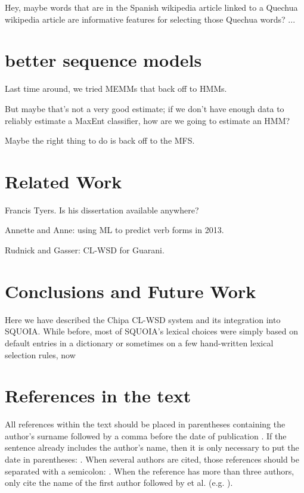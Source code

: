 \documentclass[10pt, a4paper]{article}
\begin{document}
Hey, maybe words that are in the Spanish wikipedia article linked to a Quechua wikipedia article are informative features for selecting those Quechua words? ...


\section{better sequence models}


Last time around, we tried MEMMs that back off to HMMs.


But maybe that's not a very good estimate; if we don't have enough data to reliably estimate a MaxEnt classifier, how are we going to estimate an HMM?


Maybe the right thing to do is back off to the MFS.




\section{Related Work}
Francis Tyers. Is his dissertation available anywhere?


Annette and Anne: using ML to predict verb forms in 2013.


Rudnick and Gasser: CL-WSD for Guarani.


\section{Conclusions and Future Work}
Here we have described the Chipa CL-WSD system and its integration into SQUOIA. While before, most of SQUOIA's lexical choices were simply based on default entries in a dictionary or sometimes on a few hand-written lexical selection rules, now 


\section{References in the text}

All references within the text should be placed in parentheses containing the author's surname followed by a comma before the date of publication \cite{Martin-90}. If the sentence already includes the author's name, then it is only necessary to put the date in parentheses: . When several authors are cited, those references should be separated with a semicolon: \cite{Martin-90,CastorPollux-92}. When the reference has more than three authors, only cite the name of the first author followed by et al. (e.g. \cite{Superman-Batman-Catwoman-Spiderman-00}).
\end{document}
